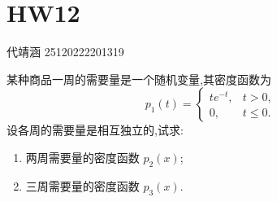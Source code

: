 \documentclass[../main.tex]{subfiles}
\begin{document}
\ifSubfilesClassLoaded{

    
    \setcounter{chapter}{11}
}{}

\chapter{ HW12 }
 代靖涵 25120222201319
\begin{exercise}{}{}
某种商品一周的需要量是一个随机变量,其密度函数为
\[
p_1(t)=
\begin{cases}
te^{-t}, & t>0,\\
0, & t\leq 0.
\end{cases}
\]
设各周的需要量是相互独立的,试求:
\begin{enumerate}
\item 两周需要量的密度函数 \(p_2(x)\);
\item 三周需要量的密度函数 \(p_3(x)\).
\end{enumerate}
\end{exercise}
\end{document}
